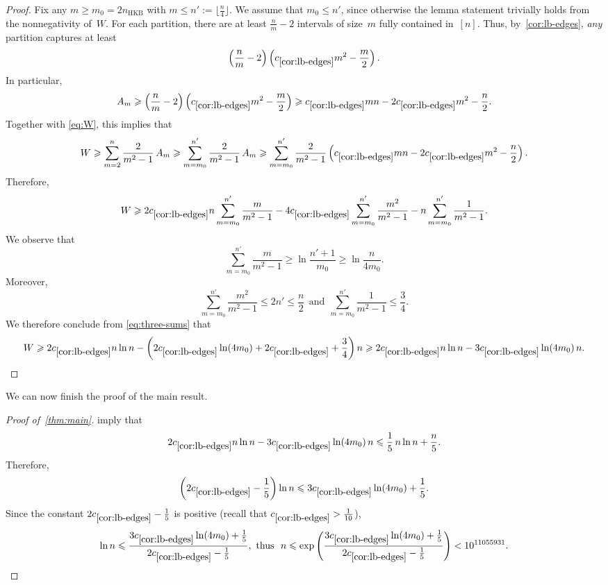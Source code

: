 \documentclass[11pt,a4paper]{article}
\let\qedhere\relax
\newcommand{\hkb}{n_{\mathrm{HKB}}}
\begin{document}
\begin{proof}
  Fix any $m \geqslant m_0 = 2 \hkb$ with $m \leqslant n' := \lfloor \frac{n}{4} \rfloor$.
  We assume that $m_0 \leqslant n'$, since otherwise the lemma statement trivially holds from the nonnegativity of~$W$.
  For each partition, there are at least $\frac{n}{m}-2$ intervals of size~$m$ fully contained in~$[n]$.
  Thus, by~\cref{cor:lb-edges}, \emph{any} partition captures at least
  \[\left(\frac{n}{m}-2\right) \left(c_{\ref{cor:lb-edges}}m^2-\frac{m}{2}\right).\]
  In particular,
  \[A_m \geqslant \left(\frac{n}{m}-2\right) \left(c_{\ref{cor:lb-edges}}m^2-\frac{m}{2}\right) \geqslant c_{\ref{cor:lb-edges}}mn - 2c_{\ref{cor:lb-edges}}m^2 - \frac{n}{2}.\]
  Together with \cref{eq:W}, this implies that
  \[ W \geqslant \sum\limits_{m=2}^n \frac{2}{m^2-1}\,A_m \geqslant \sum\limits_{m=m_0}^{n'} \frac{2}{m^2-1}\,A_m \geqslant \sum\limits_{m=m_0}^{n'} \frac{2}{m^2-1} \left(c_{\ref{cor:lb-edges}}mn - 2c_{\ref{cor:lb-edges}}m^2 - \frac{n}{2}\right).\]
  Therefore,
  \begin{equation}\label{eq:three-sums}
    W \geqslant 2c_{\ref{cor:lb-edges}}n \sum\limits_{m=m_0}^{n'} \frac{m}{m^2-1} - 4c_{\ref{cor:lb-edges}} \sum\limits_{m=m_0}^{n'} \frac{m^2}{m^2-1} - n \sum\limits_{m=m_0}^{n'} \frac{1}{m^2-1}.
  \end{equation}
  We observe that
  \[\sum\limits_{m=m_0}^{n'} \frac{m}{m^2-1} \geqslant \ln \frac{n'+1}{m_0} \geqslant \ln \frac{n}{4m_0}.\]
  Moreover,
  \[ \sum\limits_{m=m_0}^{n'} \frac{m^2}{m^2-1} \leqslant  2n' \leqslant \frac{n}{2}~~\text{and}~~\sum\limits_{m=m_0}^{n'} \frac{1}{m^2-1} \leqslant \frac{3}{4}.\]
  We therefore conclude from \cref{eq:three-sums} that
  \[ W \geqslant 2c_{\ref{cor:lb-edges}}n \ln n - \left(2c_{\ref{cor:lb-edges}} \ln(4m_0) + 2c_{\ref{cor:lb-edges}}  + \frac{3}{4}\right) n
  \geqslant 2c_{\ref{cor:lb-edges}}n \ln n - 3c_{\ref{cor:lb-edges}} \ln(4m_0)\,n. \qedhere\]
\end{proof}

We can now finish the proof of the main result.

\begin{proof}[Proof of~\cref{thm:main}]
   imply that
  \[2c_{\ref{cor:lb-edges}}n \ln n- 3c_{\ref{cor:lb-edges}} \ln(4m_0)\,n \leqslant \frac{1}{5}\,n \ln n + \frac{n}{5}.\]
  Therefore,
  \[\left(2c_{\ref{cor:lb-edges}} - \frac{1}{5}\right) \ln n \leqslant 3c_{\ref{cor:lb-edges}} \ln(4m_0) + \frac{1}{5}.\]
  Since the constant $2c_{\ref{cor:lb-edges}} - \frac{1}{5}$ is positive (recall that $c_{\ref{cor:lb-edges}} > \frac{1}{10}$),
   \[\ln n \leqslant \frac{3c_{\ref{cor:lb-edges}} \ln(4m_0) + \frac{1}{5}}{2c_{\ref{cor:lb-edges}} - \frac{1}{5}},~\text{thus}~~n \leqslant \exp\left(\frac{3c_{\ref{cor:lb-edges}} \ln(4m_0)+\frac{1}{5}}{2c_{\ref{cor:lb-edges}} - \frac{1}{5}}\right) < 10^{11055931}. \qedhere\]
\end{proof}
\end{document}

